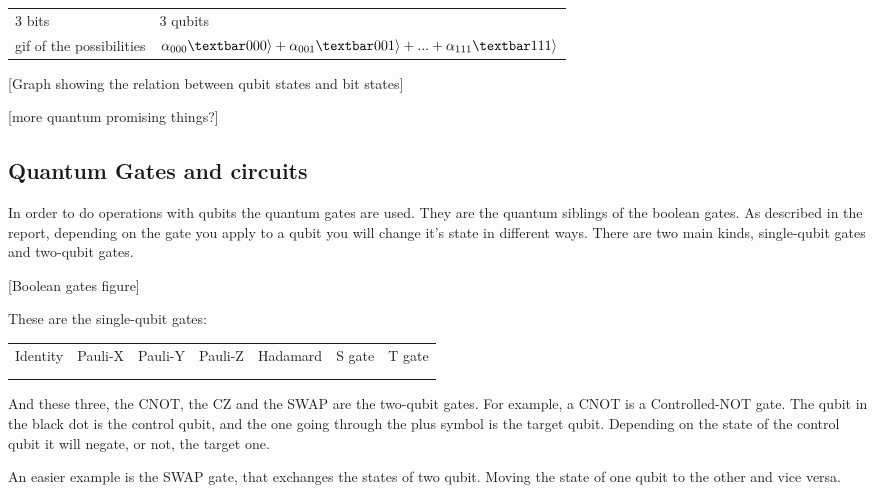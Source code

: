 \documentclass[11pt]{article}
\begin{document}
\begin{center}
\begin{tabular}{ll}
3 bits & 3 qubits\\
gif of the possibilities & \(\alpha_{000} \textbar 000\rangle +\alpha_{001} \textbar 001\rangle + ... + \alpha_{111} \textbar 111\rangle\)\\
\end{tabular}
\end{center}


[Graph showing the relation between qubit states and bit states]

[more quantum promising things?]


\subsection{Quantum Gates and circuits}
\label{sec:orgcdfc933}

In order to do operations with qubits the quantum gates are used.
They are the quantum siblings of the boolean gates.
As described in the report, depending on the gate you apply to a qubit you will change it's state in different ways.
There are two main kinds, single-qubit gates and two-qubit gates.

[Boolean gates figure]

These are the single-qubit gates:

\begin{center}
\begin{tabular}{lllllll}
Identity & Pauli-X & Pauli-Y & Pauli-Z & Hadamard & S gate & T gate\\
 &  &  &  &  &  & \\
 &  &  &  &  &  & \\
\end{tabular}
\end{center}


And these three, the CNOT, the CZ and the SWAP are the two-qubit gates.
For example, a CNOT is a Controlled-NOT gate.
The qubit in the black dot is the control qubit, and the one going through the plus symbol is the target qubit.
Depending on the state of the control qubit it will negate, or not, the target one.

An easier example is the SWAP gate, that exchanges the states of two qubit.
Moving the state of one qubit to the other and vice versa.
\end{document}
